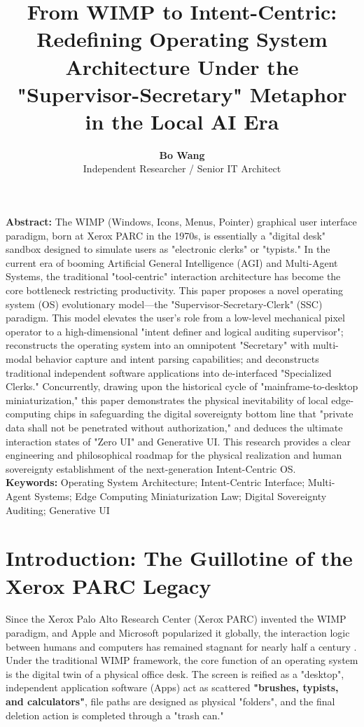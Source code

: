 \documentclass[11pt,a4paper]{article}
\title{\vspace{-1.5cm}\textbf{\Large From WIMP to Intent-Centric: Redefining Operating System Architecture Under the "Supervisor-Secretary" Metaphor in the Local AI Era}}
\author{\textbf{Bo Wang}\\
\small Independent Researcher / Senior IT Architect}
\date{}
\newenvironment{customabstract}
{\begin{mdframed}[backgroundcolor=black!5, leftline=true, rightline=false, topline=false, bottomline=false, linecolor=black!80, linewidth=2pt, innerleftmargin=10pt, innerrightmargin=10pt, innertopmargin=10pt, innerbottommargin=10pt]
\noindent\textbf{Abstract:}\quad}
{\end{mdframed}}
\begin{document}
\maketitle

\vspace{-1cm}

\begin{customabstract}
The WIMP (Windows, Icons, Menus, Pointer) graphical user interface paradigm, born at Xerox PARC in the 1970s, is essentially a "digital desk" sandbox designed to simulate users as "electronic clerks" or "typists." In the current era of booming Artificial General Intelligence (AGI) and Multi-Agent Systems, the traditional "tool-centric" interaction architecture has become the core bottleneck restricting productivity. This paper proposes a novel operating system (OS) evolutionary model---the "Supervisor-Secretary-Clerk" (SSC) paradigm. This model elevates the user's role from a low-level mechanical pixel operator to a high-dimensional "intent definer and logical auditing supervisor"; reconstructs the operating system into an omnipotent "Secretary" with multi-modal behavior capture and intent parsing capabilities; and deconstructs traditional independent software applications into de-interfaced "Specialized Clerks." Concurrently, drawing upon the historical cycle of "mainframe-to-desktop miniaturization," this paper demonstrates the physical inevitability of local edge-computing chips in safeguarding the digital sovereignty bottom line that "private data shall not be penetrated without authorization," and deduces the ultimate interaction states of "Zero UI" and Generative UI. This research provides a clear engineering and philosophical roadmap for the physical realization and human sovereignty establishment of the next-generation Intent-Centric OS.\\

\noindent\textbf{Keywords:} Operating System Architecture; Intent-Centric Interface; Multi-Agent Systems; Edge Computing Miniaturization Law; Digital Sovereignty Auditing; Generative UI
\end{customabstract}

\vspace{0.5cm}

\section{Introduction: The Guillotine of the Xerox PARC Legacy}

Since the Xerox Palo Alto Research Center (Xerox PARC) invented the WIMP paradigm, and Apple and Microsoft popularized it globally, the interaction logic between humans and computers has remained stagnant for nearly half a century \cite{myers1998}. Under the traditional WIMP framework, the core function of an operating system is the digital twin of a physical office desk. The screen is reified as a "desktop", independent application software (Apps) act as scattered \textbf{"brushes, typists, and calculators"}, file paths are designed as physical "folders", and the final deletion action is completed through a "trash can."
\end{document}
